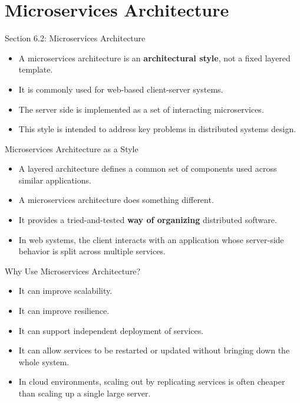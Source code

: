 \section{Microservices Architecture}

\begin{frame}{Section 6.2: Microservices Architecture}
\begin{itemize}
    \item A microservices architecture is an \textbf{architectural style}, not a fixed layered template.
    \item It is commonly used for web-based client-server systems.
    \item The server side is implemented as a set of interacting microservices.
    \item This style is intended to address key problems in distributed systems design.
\end{itemize}
\end{frame}

\begin{frame}{Microservices Architecture as a Style}
\begin{itemize}
    \item A layered architecture defines a common set of components used across similar applications.
    \item A microservices architecture does something different.
    \item It provides a tried-and-tested \textbf{way of organizing} distributed software.
    \item In web systems, the client interacts with an application whose server-side behavior is split across multiple services.
\end{itemize}
\end{frame}

\begin{frame}{Why Use Microservices Architecture?}
\begin{itemize}
    \item It can improve scalability.
    \item It can improve resilience.
    \item It can support independent deployment of services.
    \item It can allow services to be restarted or updated without bringing down the whole system.
    \item In cloud environments, scaling out by replicating services is often cheaper than scaling up a single large server.
\end{itemize}
\end{frame}

